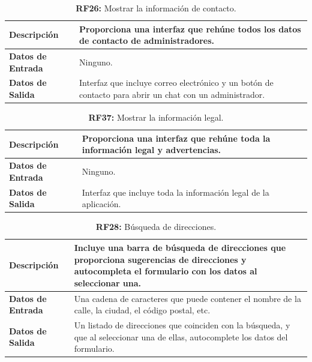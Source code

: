 \documentclass[a4paper, 12pt]{article}
\begin{document}
\begin{table}[H]
\captionsetup{list=no}%
\captionsetup{justification=raggedright,singlelinecheck=false}
\captionsetup{labelformat=empty}
\caption*{\textbf{RF26:} Mostrar la información de contacto.}
\label{tab:RF26}
	\begin{tabular}{|m{5cm}|m{10cm}|}
	\hline
	\textbf{Descripción} & Proporciona una interfaz que rehúne todos los datos de contacto de administradores. \\ 
	\hline
	\textbf{Datos de Entrada} & Ninguno. \\ 
	\hline
	\textbf{Datos de Salida} & Interfaz que incluye correo electrónico y un botón de contacto para abrir un chat con un administrador. \\ 
	\hline
\end{tabular}
\end{table}

\begin{table}[H]
\captionsetup{list=no}%
\captionsetup{justification=raggedright,singlelinecheck=false}
\captionsetup{labelformat=empty}
\caption*{\textbf{RF37:} Mostrar la información legal.}
\label{tab:RF27}
	\begin{tabular}{|m{5cm}|m{10cm}|}
	\hline
	\textbf{Descripción} & Proporciona una interfaz que rehúne toda la información legal y advertencias. \\ 
	\hline
	\textbf{Datos de Entrada} & Ninguno. \\ 
	\hline
	\textbf{Datos de Salida} & Interfaz que incluye toda la información legal de la aplicación. \\ 
	\hline
\end{tabular}
\end{table}

\begin{table}[H]
\captionsetup{list=no}%
\captionsetup{justification=raggedright,singlelinecheck=false}
\captionsetup{labelformat=empty}
\caption*{\textbf{RF28:} Búsqueda de direcciones.}
\label{tab:RF28}
	\begin{tabular}{|m{5cm}|m{10cm}|}
	\hline
	\textbf{Descripción} & Incluye una barra de búsqueda de direcciones que proporciona sugerencias de direcciones y autocompleta el formulario con los datos al seleccionar una. \\ 
	\hline
	\textbf{Datos de Entrada} & Una cadena de caracteres que puede contener el nombre de la calle, la ciudad, el código postal, etc. \\ 
	\hline
	\textbf{Datos de Salida} & Un listado de direcciones que coinciden con la búsqueda, y que al seleccionar una de ellas, autocomplete los datos del formulario. \\ 
	\hline
\end{tabular}
\end{table}
\end{document}
